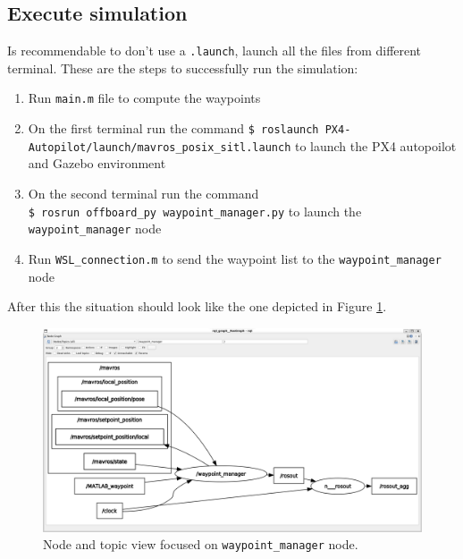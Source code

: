\subsection{Execute simulation}
Is recommendable to don't use a \texttt{.launch}, launch all the files from different terminal. These are the steps to successfully run the simulation:
\begin{enumerate}
	\item Run \texttt{main.m} file to compute the waypoints
	\item On the first terminal run the command \texttt{\$ roslaunch PX4-Autopilot/launch/mavros\_posix\_sitl.launch} to launch the PX4 autopoilot and Gazebo environment
	\item On the second terminal run the command \\
	\texttt{\$ rosrun offboard\_py waypoint\_manager.py} to launch the \texttt{waypoint\_manager} node
	\item Run \texttt{WSL\_connection.m} to send the waypoint list to the \texttt{waypoint\_manager} node
\end{enumerate}
After this the situation should look like the one depicted in Figure \ref{fig:rqt_graph_view}.
\begin{figure}[hbt!]
	\centering
	\includegraphics[width=\linewidth]{"images/rqt_graph view"}
	\caption{Node and topic view focused on \texttt{waypoint\_manager} node.}
	\label{fig:rqt_graph_view}
\end{figure}
